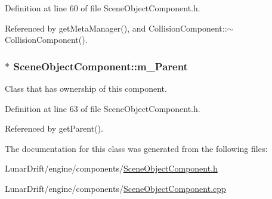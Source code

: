 Definition at line 60 of file Scene\+Object\+Component.\+h.



Referenced by get\+Meta\+Manager(), and Collision\+Component\+::$\sim$\+Collision\+Component().

\subsubsection[{\texorpdfstring{m\+\_\+\+Parent}{m_Parent}}]{$\ast$ Scene\+Object\+Component\+::m\+\_\+\+Parent\hspace{0.3cm}{\ttfamily [private]}}\hypertarget{class_scene_object_component_ad7992ff4976be980767939e44eba2b2f}{}\label{class_scene_object_component_ad7992ff4976be980767939e44eba2b2f}


Class that has ownership of this component. 



Definition at line 63 of file Scene\+Object\+Component.\+h.



Referenced by get\+Parent().



The documentation for this class was generated from the following files\+:\begin{DoxyCompactItemize}
\item 
Lunar\+Drift/engine/components/\hyperlink{_scene_object_component_8h}{Scene\+Object\+Component.\+h}\item 
Lunar\+Drift/engine/components/\hyperlink{_scene_object_component_8cpp}{Scene\+Object\+Component.\+cpp}\end{DoxyCompactItemize}
